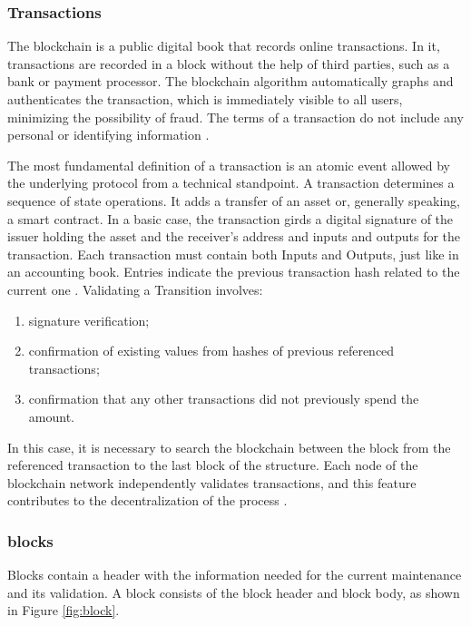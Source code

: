 \subsubsection{Transactions}\label{sec:transac}
The blockchain is a public digital book that records online transactions. In it, transactions are recorded in a block without the help of third parties, such as a bank or payment processor. The blockchain algorithm automatically graphs and authenticates the transaction, which is immediately visible to all users, minimizing the possibility of fraud. The terms of a transaction do not include any personal or identifying information \cite{Bankrate2018}.

The most fundamental definition of a transaction is an atomic event allowed by the underlying protocol from a technical standpoint. A transaction determines a sequence of state operations.  It adds a transfer of an asset or, generally speaking, a smart contract.  In a basic case, the transaction girds a digital signature of the issuer holding the asset and the receiver's address and inputs and outputs for the transaction. Each transaction must contain both Inputs and Outputs, just like in an accounting book. Entries indicate the previous transaction hash related to the current one \cite{greve2018blockchain}. Validating a Transition involves:

\begin{enumerate}
	\item signature verification;
	\item confirmation of existing values from hashes of previous referenced transactions;
	\item confirmation that any other transactions did not previously spend the amount.
\end{enumerate}

In this case, it is necessary to search the blockchain between the block from the referenced transaction to the last block of the structure. Each node of the blockchain network independently validates transactions, and this feature contributes to the decentralization of the process \cite{greve2018blockchain}.

\subsubsection{blocks}\label{sec:blocks}
Blocks contain a header with the information needed for the current maintenance and its validation. A block consists of the block header and block body, as shown in Figure \ref{fig:block}. 

